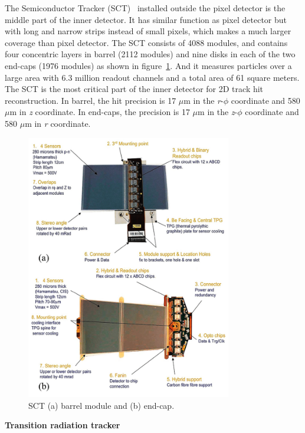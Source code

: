 The Semiconductor Tracker (SCT)~\cite{SCT_2007} installed outside the pixel detector is the middle part of the inner detector.
It has similar function as pixel detector but with long and narrow strips instead of small pixels, which makes a much larger coverage than pixel detector.
The SCT consists of 4088 modules, and contains four concentric layers in barrel (2112 modules) and nine disks in each of the two end-caps (1976 modules) as shown in figure~\ref{fig:inner_sct}.
And it measures particles over a large area with 6.3 million readout channels and a total area of 61 square meters.
The SCT is the most critical part of the inner detector for 2D track hit reconstruction.
In barrel, the hit precision is 17 $\mu$m in the \textit{r}-$\phi$ coordinate and 580 $\mu$m in \textit{z} coordinate.
In end-caps, the precision is 17 $\mu$m in the \textit{z}-$\phi$ coordinate and 580 $\mu$m in \textit{r} coordinate.
\begin{figure}[!htb]
  \centering
  \includegraphics[width=0.8\textwidth]{figures/Detector/inner_SCT.png}
  \caption{SCT (a) barrel module and (b) end-cap\cite{Sultan:phdthesis}.}
  \label{fig:inner_sct}
\end{figure}

\textbf{Transition radiation tracker}

